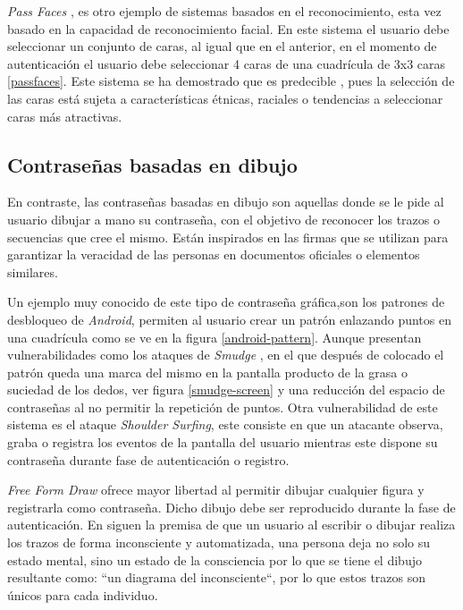 \textit{Pass Faces} \cite{Tuscano2015GraphicalPA}, \cite{inproceedings} es otro ejemplo de sistemas basados en el reconocimiento, esta vez basado en la capacidad de reconocimiento facial. En este sistema el usuario debe seleccionar un conjunto de caras, al igual que en el anterior, en el momento de autenticación el usuario debe seleccionar 4 caras de una cuadrícula de 3x3 caras \ref{passfaces}. Este sistema se ha demostrado que es predecible \cite{Tuscano2015GraphicalPA}, pues la selección de las caras está sujeta a características étnicas, raciales o tendencias a seleccionar caras más atractivas.





\subsection{Contraseñas basadas en dibujo}
En contraste, las contraseñas basadas en dibujo son aquellas donde se le pide al usuario dibujar a mano su contraseña, con el objetivo de reconocer los trazos o secuencias que cree el mismo. Están inspirados en las firmas que se utilizan para garantizar la veracidad de las personas en documentos oficiales o elementos similares. 

Un ejemplo muy conocido de este tipo de contraseña gráfica,son los patrones de desbloqueo de \textit{Android}, permiten al usuario crear un patrón enlazando puntos en una cuadrícula como se ve en la figura \ref{android-pattern}. Aunque presentan vulnerabilidades como los ataques de \emph{Smudge} \cite{aviv2010smudge}, en el que después de colocado el patrón queda una marca del mismo en la pantalla producto de la grasa o suciedad de los dedos, ver figura \ref{smudge-screen} y una reducción del espacio de contraseñas al no permitir la repetición de puntos. Otra vulnerabilidad de este sistema  es el ataque \emph{Shoulder Surfing}, este consiste en que un atacante observa, graba o registra los eventos de la pantalla del usuario mientras este dispone su contraseña durante fase de autenticación o registro.






\textit{Free Form Draw} \cite{lin2009free} ofrece mayor libertad al permitir dibujar cualquier figura y registrarla como contraseña. Dicho dibujo debe ser reproducido durante la fase de autenticación. En \cite{lin2009free} siguen la premisa de que un usuario al escribir o dibujar realiza los trazos de forma inconsciente y automatizada, una persona deja no solo su estado mental, sino un estado de la consciencia por lo que se tiene el dibujo resultante como: ``un diagrama del inconsciente``, por lo que estos trazos son únicos para cada individuo. 

